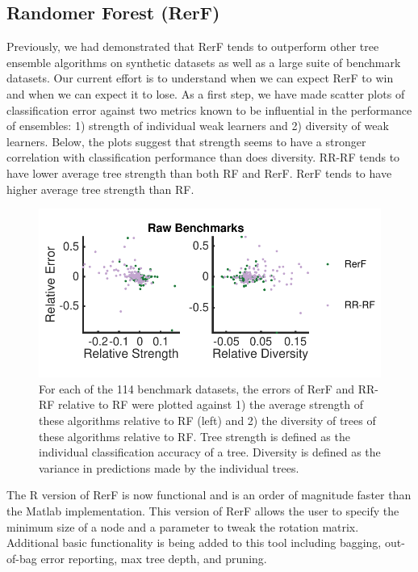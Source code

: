 \documentclass[simplex.tex]{subfiles}
\begin{document}
\subsection[Randomer Forest]{Randomer Forest (RerF)}

Previously, we had demonstrated that RerF tends to outperform other tree ensemble algorithms on synthetic datasets as well as a large suite of benchmark datasets. Our current effort is to understand when we can expect RerF to win and when we can expect it to lose. As a first step, we have made scatter plots of classification error against two metrics known to be influential in the performance of ensembles: 1) strength of individual weak learners and 2) diversity of weak learners. Below, the plots suggest that strength seems to have a stronger correlation with classification performance than does diversity. RR-RF tends to have lower average tree strength than both RF and RerF. RerF tends to have higher average tree strength than RF.

\begin{figure}[h!]
\begin{cframed}
\centering
\includegraphics[height=0.33\textheight]{../../figs/PAMI_fig10_strength_diversity_benchmark.pdf}
\caption{
For each of the 114 benchmark datasets, the errors of RerF and RR-RF relative to RF were plotted against 1) the average strength of these algorithms relative to RF (left) and 2) the diversity of trees of these algorithms relative to RF. Tree strength is defined as the individual classification accuracy of a tree. Diversity is defined as the variance in predictions made by the individual trees.
}
\label{fig:RefF3}
\end{cframed}
\end{figure}

The R version of RerF is now functional and is an order of magnitude faster than the Matlab implementation.  This version of RerF allows the user to specify the minimum size of a node and a parameter to tweak the rotation matrix.  Additional basic functionality is being added to this tool including bagging, out-of-bag error reporting, max tree depth, and pruning.
\end{document}
